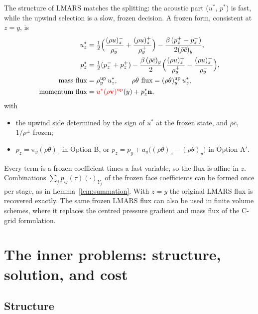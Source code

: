 \documentclass[11pt,a4paper]{article}
\theoremstyle{definition}
\theoremstyle{remark}
\begin{document}
The structure of LMARS matches the splitting: the acoustic part
($u^*$, $p^*$) is fast, while the upwind selection is a slow, frozen
decision. A frozen form, consistent at $z=y$, is
\begin{align*}
 u^*_z&=\tfrac12\Big(\frac{(\rho u)^-_z}{\rho^-_y}+\frac{(\rho u)^+_z}{\rho^+_y}\Big)
       -\frac{\beta\,(p^+_z-p^-_z)}{2(\bar\rho\bar c)_y},\\
 p^*_z&=\tfrac12(p^-_z+p^+_z)-\frac{\beta\,(\bar\rho\bar c)_y}{2}
       \Big(\frac{(\rho u)^+_z}{\rho^+_y}-\frac{(\rho u)^-_z}{\rho^-_y}\Big),\\
 \text{mass flux}&=\rho^{\mathrm{up}}_y\,u^*_z,\qquad
 \rho\theta\text{ flux}=(\rho\theta)^{\mathrm{up}}_y\,u^*_z,\\
 \text{momentum flux}&=\textcolor{red}{u^*(\rho\mathbf v)^{\mathrm{up}}}(y)+p^*_z\mathbf n,
\end{align*}
with
\begin{itemize}
\item the upwind side determined by the sign of $u^*$ at the frozen
  state, and $\bar\rho\bar c$, $1/\rho^\pm$ frozen;
\item $p_z=\pi_y(\rho\theta)_z$ in Option B, or
  $p_z=p_y+a_y\big((\rho\theta)_z-(\rho\theta)_y\big)$ in Option A$'$.
\end{itemize}
Every term is a frozen coefficient times a fast variable, so the flux is
affine in $z$. Combinations $\sum_jp_{ij}(\tau)(\cdot)_{Y_j}$ of the
frozen face coefficients can be formed once per stage, as in
Lemma~\ref{lem:summation}. With $z=y$ the original LMARS flux is
recovered exactly. The same frozen LMARS flux can also be used in finite
volume schemes, where it replaces the centred pressure gradient and mass
flux of the C-grid formulation.

\section{The inner problems: structure, solution, and cost}
\label{sec:inner}

\subsection{Structure}
\end{document}
